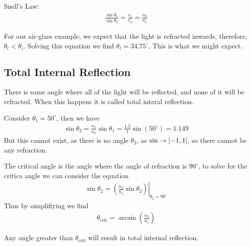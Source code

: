 \documentclass[../pbr.tex]{subfile}
\begin{document}
Snell's Law:
\begin{align*}
  \frac{\sin\theta_1}{\sin\theta_2}=\frac{v_1}{v_2}=\frac{n_2}{n_1}
\end{align*}

For our air-glass example, we expect that the light is refracted inwards,
therefore, $\theta_t<\theta_i$. Solving this equation we find
$\theta_t=34.75^\circ$. This is what we might expect.

\subsection{Total Internal Reflection}%
\label{sub:total_internal_reflection}

There is some angle where all of the light will be reflected, and none of it
will be refracted. When this happens it is called total interal reflection.

\begin{Figure}
  \begin{center}
    \centering
    \begin{minipage}{0.3\textwidth}
      \begin{center}
        
      \end{center}
    \end{minipage}
    \begin{minipage}{0.3\textwidth}
      \begin{center}
        
      \end{center}
    \end{minipage}
    \begin{minipage}{0.3\textwidth}
      \begin{center}
        
      \end{center}
    \end{minipage}
  \end{center}
  \label{fig:06_1}
\end{Figure}

Consider $\theta_1=50^\circ$, then we have
\begin{align*}
  \sin\theta_2=\frac{n_1}{n_2}\sin\theta_1=\frac{1.5}{1}\sin\left(50^\circ\right)=1.149
\end{align*}
But this cannot exist, as there is no angle $\theta_2$, as $\sin\rightarrow[-1,1]$,
so there cannot be any refraction.

The critical angle is the angle where the angle of refraction is $90^\circ$,
to solve for the critica angle we can consider the equation
\begin{align*}
  \sin\theta_2=\left.\left(\frac{n_2}{n_1}\sin\theta_2\right)\right|_{\theta_2=90^\circ}
\end{align*}
Thus by simplifiying we find
\begin{align*}
  \theta_\text{crit}=\arcsin\left(\frac{n_2}{n_1}\right)
\end{align*}

Any angle greater than $\theta_\text{crit}$ will result in total internal
reflection.
\end{document}
